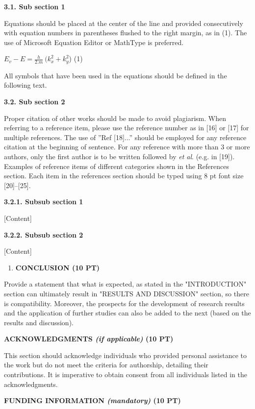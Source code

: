 \documentclass[
]{article}
\begin{document}
\textbf{3.1. Sub section 1}

Equations should be placed at the center of the line and provided consecutively with equation numbers in parentheses flushed to the right margin, as in (1). The use of Microsoft Equation Editor or MathType is preferred.

\(E_{v} - E = \frac{h}{2.m}\ (k_{x}^{2} + k_{y}^{2}\)) (1)

All symbols that have been used in the equations should be defined in the following text.

\textbf{3.2. Sub section 2}

Proper citation of other works should be made to avoid plagiarism. When referring to a reference item, please use the reference number as in {[}16{]} or {[}17{]} for multiple references. The use of ''Ref {[}18{]}...'' should be employed for any reference citation at the beginning of sentence. For any reference with more than 3 or more authors, only the first author is to be written followed by \emph{et al}. (e.g. in {[}19{]}). Examples of reference items of different categories shown in the References section. Each item in the references section should be typed using 8 pt font size {[}20{]}--{[}25{]}.

\textbf{3.2.1. Subsub section 1}

[Content]

\textbf{3.2.2. Subsub section 2}

[Content]

\begin{enumerate}
\def\labelenumi{\arabic{enumi}.}
\setcounter{enumi}{3}
\item
  \textbf{CONCLUSION (10 PT)}
\end{enumerate}

Provide a statement that what is expected, as stated in the "INTRODUCTION" section can ultimately result in "RESULTS AND DISCUSSION" section, so there is compatibility. Moreover, the prospects for the development of research results and the application of further studies can also be added to the next (based on the results and discussion).

\textbf{ACKNOWLEDGMENTS \emph{(if applicable)} (10 PT)}

This section should acknowledge individuals who provided personal assistance to the work but do not meet the criteria for authorship, detailing their contributions. It is imperative to obtain consent from all individuals listed in the acknowledgments.

\textbf{FUNDING INFORMATION \emph{(mandatory)} (10 PT)}
\end{document}
